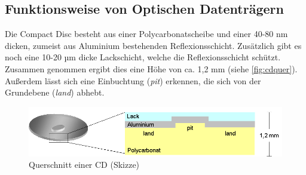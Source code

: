 \subsection{Funktionsweise von Optischen Datenträgern}
\label{subsec:cdfunktionsweise}

Die Compact Disc besteht aus einer Polycarbonatscheibe und einer 40-80 nm
dicken, zumeist aus Aluminium bestehenden Reflexionsschicht. Zusätzlich gibt es
noch eine 10-20 µm dicke Lackschicht, welche die Reflexionsschicht schützt.
Zusammen genommen ergibt dies eine Höhe von ca. 1,2 mm (siehe
\autoref{fig:cdquer}). Außerdem lässt sich eine Einbuchtung (\textit{pit})
erkennen, die sich von der Grundebene (\textit{land}) abhebt. \cite{cfcd}

\begin{figure}[h]
    \begin{center}
        \begin{minipage}[t]{\textwidth}
            \begin{center}
                \includegraphics[height=0.1\textheight]{Bilder/Optische_Datentraeger_Die_Compact_Disc/Funktionsweise/cdquer.png}
                \caption[Querschnitt einer CD (Skizze) \newline \url{http://daten.didaktikchemie.uni-bayreuth.de/umat/cd_dvd/cd-ausschnitt.gif} (zuletzt aufgerufen am 07.08.2015)]{Querschnitt einer CD (Skizze)}
                \label{fig:cdquer}
            \end{center}
        \end{minipage}
    \end{center}
\end{figure}

